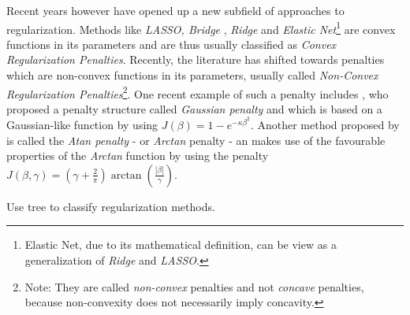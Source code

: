 \documentclass[12pt,a4paper]{article}
\newenvironment{lightbluebox}{%
    \begin{tcolorbox}[colback=lightblue, colframe=lightblue, fontupper=\itshape]%
}{%
    \end{tcolorbox}%
}
\begin{document}
Recent years however have opened up a new subfield of approaches to regularization. Methods like \textit{LASSO, Bridge} \parencite{FrankFriedman1993}, \textit{Ridge} and \textit{Elastic Net}\footnote{Elastic Net, due to its mathematical definition, can be view as a generalization of \textit{Ridge} and \textit{LASSO}.} are convex functions in its parameters and are thus usually classified as \textit{Convex Regularization Penalties}. Recently, the literature has shifted towards penalties which are non-convex functions in its parameters, usually called \textit{Non-Convex Regularization Penalties}\footnote{Note: They are called \textit{non-convex} penalties and not \textit{concave} penalties, because non-convexity does not necessarily imply concavity.}. One recent example of such a penalty includes \textcite{JohnVettamWu2022}, who proposed a penalty structure called \textit{Gaussian penalty} and which is based on a Gaussian-like function by using $J(\beta) = 1 - e^{-\kappa\beta^2}$. Another method proposed by \textcite{WangZhu2016} is called the \textit{Atan penalty} - or \textit{Arctan} penalty - an makes use of the favourable properties of the \textit{Arctan} function by using the penalty $J(\beta, \gamma) = (\gamma + \frac{2}{\pi})\arctan(\frac{|\beta|}{\gamma})$.


\begin{lightbluebox}
Use tree to classify regularization methods.
\end{lightbluebox}
\begin{center}

\end{center}
\end{document}
